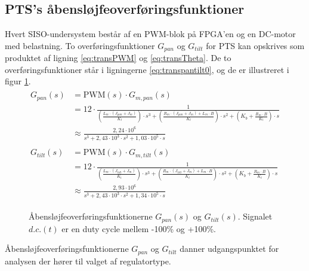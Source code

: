 \subsection{PTS's åbensløjfeoverføringsfunktioner}
Hvert SISO-undersystem består af en PWM-blok på FPGA'en og en DC-motor med belastning.
To overføringsfunktioner \(G_{pan}\) og \(G_{tilt}\) for PTS kan opskrives
som produktet af ligning \ref{eq:transPWM} og \ref{eq:transTheta}. De to overføringsfunktioner
står i ligningerne \ref{eq:transpantilt0}, og de er illustreret i figur \ref{fig:openloop1}.
\begin{align}
\label{eq:transpantilt0}
\begin{split}
	G_{pan}\left(s\right)&=\text{PWM}\left(s\right)\cdot{}G_{m,pan}\left(s\right)\\
	&=12\cdot{}\frac{1}
			{\left(\frac{L_m\cdot{}\left(J_{pan}+J_m\right)}{K_t}\right)\cdot{}s^3
			+\left(\frac{R_m\cdot{}\left(J_{pan}+J_m\right)+L_m\cdot{}B}{K_t}\right)\cdot{}s^2
			+\left(K_b+\frac{R_m\cdot{}B}{K_t}\right)\cdot{}s}\\
	&\approx\frac{2,24\cdot{}10^6}{s^3 + 2,43\cdot{}10^3 \cdot{} s^2 + 1,03\cdot{}10^5\cdot{}s}
	\\
	\\
	G_{tilt}\left(s\right)&=\text{PWM}\left(s\right)\cdot{}G_{m,tilt}\left(s\right)\\
	&=12\cdot{}\frac{1}
			{\left(\frac{L_m\cdot{}\left(J_{tilt}+J_m\right)}{K_t}\right)\cdot{}s^3
			+\left(\frac{R_m\cdot{}\left(J_{tilt}+J_m\right)+L_m\cdot{}B}{K_t}\right)\cdot{}s^2
			+\left(K_b+\frac{R_m\cdot{}B}{K_t}\right)\cdot{}s}\\
	&\approx\frac{2,93\cdot{}10^6}{s^3 + 2,43\cdot{}10^3 \cdot{} s^2 + 1,34\cdot{}10^5\cdot{}s}
\end{split}
\end{align}
\begin{figure}[!th]
\centering
\begin{tikzpicture}[auto, node distance=2.6cm,>=latex']

\end{tikzpicture}
\caption[Åbensløjfeoverføringsfunktioner]{Åbensløjfeoverføringsfunktionerne \(G_{pan}\left(s\right)\) og \(G_{tilt}\left(s\right)\).
	Signalet \(d.c.\left(t\right)\) er en duty cycle mellem -100\% og +100\%.}
\label{fig:openloop1}
\end{figure}

Åbensløjfeoverføringsfunktionerne \(G_{pan}\) og \(G_{tilt}\) danner udgangspunktet
for analysen der hører til valget af regulatortype.

